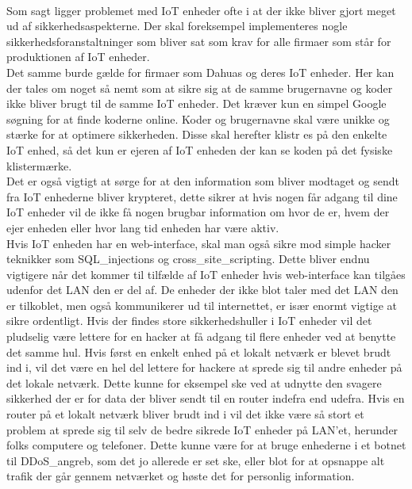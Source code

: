     \autocite{Androidauthority}\\
    Som sagt ligger problemet med IoT enheder ofte i at der ikke bliver gjort meget ud af sikkerhedsaspekterne. Der skal foreksempel implementeres nogle sikkerhedsforanstaltninger som bliver sat som krav for alle firmaer som står for produktionen af IoT enheder.\\ 
    Det samme burde gælde for firmaer som Dahuas og deres IoT enheder. 
    Her kan der tales om noget så nemt som at sikre sig at de samme brugernavne og koder ikke bliver brugt til de samme IoT enheder. Det kræver kun en simpel Google søgning for at finde koderne online. Koder og brugernavne skal være unikke og stærke for at optimere sikkerheden. Disse skal herefter klistr es på den enkelte IoT enhed, så det kun er ejeren af IoT enheden der kan se koden på det fysiske klistermærke. \\ 
    Det er også vigtigt at sørge for at den information som bliver modtaget og sendt fra IoT enhederne bliver krypteret, dette sikrer at hvis nogen får adgang til dine IoT enheder vil de ikke få nogen brugbar information om hvor de er, hvem der ejer enheden eller hvor lang tid enheden har være aktiv.\\
    Hvis IoT enheden har en web-interface, skal man også sikre mod simple hacker teknikker som \Glspl{SQL_injection} og \gls{cross_site_scripting}. Dette bliver endnu vigtigere når det kommer til tilfælde af IoT enheder hvis web-interface kan tilgåes udenfor det LAN 
    den er del af. De enheder der ikke blot taler med det LAN den er tilkoblet, men også kommunikerer ud til internettet, er især enormt vigtige at sikre ordentligt. 
    Hvis der findes store sikkerhedshuller i IoT enheder vil det pludselig være lettere for en hacker at få adgang til flere enheder ved at benytte det samme hul. Hvis først en enkelt enhed på et lokalt netværk er blevet brudt ind i, vil det være en hel del lettere for hackere at sprede sig til andre enheder på det lokale netværk. 
    Dette kunne for eksempel ske ved at udnytte den svagere sikkerhed der er for data der bliver sendt til en router indefra end udefra. Hvis en router på et lokalt netværk bliver brudt ind i vil det ikke være så stort et problem at sprede sig til selv de bedre sikrede IoT enheder på LAN'et, herunder folks computere og telefoner. Dette kunne være for at bruge enhederne i et \gls{botnet} til \Gls{DDoS_angreb}, som det jo allerede er set ske, eller blot for at opsnappe alt trafik der går gennem netværket og høste det for personlig information.\\
